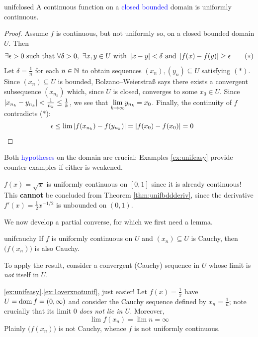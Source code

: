 \begin{thm}{}{unifclosed}
	A continuous function on a \textcolor{blue}{closed bounded} domain is uniformly continuous.
\end{thm}

\begin{proof}
	Assume $f$ is continuous, but not uniformly so, on a closed bounded domain $U$. Then
	\[
		\exists\epsilon>0\text{ such that }
		\forall\delta>0,\ \exists x,y\in U\text{ with }
		\left| x-y\right|<\delta\text{ and }\left| f(x)-f(y)\right|
		\ge\epsilon \tag*{$(\ast)$}
	\]
	Let $\delta=\frac 1n$ for each $n\in\mathbb{N}$ to obtain sequences $(x_n),(y_n)\subseteq U$ satisfying $(\ast)$.\footnotemark{}\smallbreak
	Since $(x_n)\subseteq U$ is bounded, Bolzano--Weierstraß says there exists a convergent subsequence $(x_{n_k})$ which, since $U$ is closed, converges to some $x_0\in U$.\smallbreak
	Since $\left| x_{n_k}-y_{n_k}\right|<\frac 1{n_k}\le\frac 1k$, we see that $\smash[b]{\lim\limits_{k\to\infty}}y_{n_k}=x_0$. Finally, the continuity of $f$ contradicts ($\ast$):
	\[
		\epsilon\le \lim\left| f(x_{n_k})-f(y_{n_k})\right|
		=\left| f(x_0)-f(x_0)\right|=0
		\tag*{\qedhere}
	\]
\end{proof}


Both \textcolor{blue}{hypotheses} on the domain are crucial: Examples \ref{ex:unifeasy} provide counter-examples if either is weakened.

\begin{example}{}{}
	$f(x)=\sqrt x$ is uniformly continuous on $[0,1]$ since it is already continuous! This \textbf{cannot} be concluded from Theorem \ref{thm:unifbddderiv}, since the derivative $f'(x)=\frac 12x^{-1/2}$ is unbounded on $(0,1)$.
\end{example}


We now develop a partial converse, for which we first need a lemma.


\begin{lemm}{}{unifcauchy}
	If $f$ is uniformly continuous on $U$ and $(x_n)\subseteq U$ is Cauchy, then $\bigl(f(x_n)\bigr)$ is also Cauchy.
\end{lemm}

To apply the result, consider a convergent (Cauchy) sequence in $U$ whose limit is \emph{not} itself in $U$.

\begin{example*}{\ref*{ex:unifeasy}.\ref{ex:1overxnotunif}, just easier!}{}
	Let $f(x)=\frac 1{x}$ have $U=\operatorname{dom} f=(0,\infty)$ and consider the Cauchy sequence defined by $x_n=\frac 1n$; note crucially that its limit $0$ \emph{does not lie in $U$.} Moreover,
	\[
		\lim f(x_n)=\lim n=\infty
	\]
	Plainly $\bigl(f(x_n)\bigr)$ is not Cauchy, whence $f$ is not uniformly continuous.
\end{example*}

